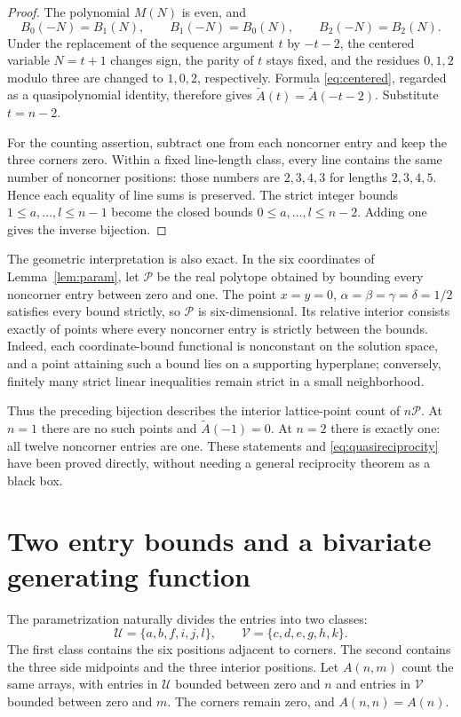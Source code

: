\documentclass[11pt]{article}
\numberwithin{equation}{section}
\theoremstyle{definition}
\begin{document}
\begin{proof}
The polynomial $M(N)$ is even, and
\[
 B_0(-N)=B_1(N),\qquad B_1(-N)=B_0(N),\qquad B_2(-N)=B_2(N).
\]
Under the replacement of the sequence argument $t$ by $-t-2$, the centered
variable $N=t+1$ changes sign, the parity of $t$ stays fixed, and the residues
$0,1,2$ modulo three are changed to $1,0,2$, respectively. Formula
\eqref{eq:centered}, regarded as a quasipolynomial identity, therefore gives
$\widetilde A(t)=\widetilde A(-t-2)$. Substitute $t=n-2$.

For the counting assertion, subtract one from each noncorner entry and keep
the three corners zero. Within a fixed line-length class, every line contains
the same number of noncorner positions: those numbers are $2,3,4,3$ for
lengths $2,3,4,5$. Hence each equality of line sums is preserved. The strict
integer bounds $1\leq a,\ldots,l\leq n-1$ become the closed bounds
$0\leq a,\ldots,l\leq n-2$. Adding one gives the inverse bijection.
\end{proof}

The geometric interpretation is also exact. In the six coordinates of
Lemma~\ref{lem:param}, let $\mathcal P$ be the real polytope obtained by
bounding every noncorner entry between zero and one. The point
$x=y=0$, $\alpha=\beta=\gamma=\delta=1/2$ satisfies every bound strictly,
so $\mathcal P$ is six-dimensional. Its relative interior consists exactly
of points where every noncorner entry is strictly between the bounds.
Indeed, each coordinate-bound functional is nonconstant on the solution
space, and a point attaining such a bound lies on a supporting hyperplane;
conversely, finitely many strict linear inequalities remain strict in a
small neighborhood.

Thus the preceding bijection describes the interior lattice-point count
of $n\mathcal P$. At $n=1$ there are no such points and
$\widetilde A(-1)=0$. At $n=2$ there is exactly one: all twelve noncorner
entries are one. These statements and \eqref{eq:quasireciprocity} have been
proved directly, without needing a general reciprocity theorem as a black box.

\section{Two entry bounds and a bivariate generating function}
\label{sec:twobound}

The parametrization naturally divides the entries into two classes:
\begin{equation}\label{eq:entryclasses}
 \mathcal U=\{a,b,f,i,j,l\},\qquad
 \mathcal V=\{c,d,e,g,h,k\}.
\end{equation}
The first class contains the six positions adjacent to corners. The second
contains the three side midpoints and the three interior positions.
Let $A(n,m)$ count the same arrays, with entries in $\mathcal U$ bounded
between zero and $n$ and entries in $\mathcal V$ bounded between zero and $m$.
The corners remain zero, and $A(n,n)=A(n)$.
\end{document}
